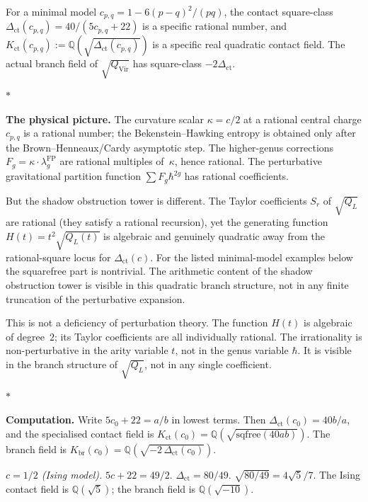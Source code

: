 \documentclass[11pt]{article}
\newcommand{\Q}{\mathbb{Q}}
\newcommand{\sep}{\bigskip\begin{center}$*$\end{center}\medskip}
\begin{document}
For a minimal model $c_{p,q} = 1 - 6(p-q)^2/(pq)$,
the contact square-class
$\Delta_{\mathrm{ct}}(c_{p,q}) = 40/(5c_{p,q} + 22)$ is a
specific rational number, and
$K_{\mathrm{ct}}(c_{p,q}) := \Q(\sqrt{\Delta_{\mathrm{ct}}(c_{p,q})})$
is a specific real quadratic contact field.  The actual branch
field of $\sqrt{Q_{\mathrm{Vir}}}$ has square-class
$-2\Delta_{\mathrm{ct}}$.

\sep

\noindent\textbf{The physical picture.}\enspace
The curvature scalar $\kappa = c/2$ at a rational
central charge $c_{p,q}$ is a rational number; the
Bekenstein--Hawking entropy is obtained only after the
Brown--Henneaux/Cardy asymptotic step.  The
higher-genus corrections $F_g = \kappa \cdot \lambda_g^{\mathrm{FP}}$
are rational multiples of~$\kappa$, hence rational.  The
perturbative gravitational partition function
$\sum F_g \hbar^{2g}$ has rational coefficients.

But the shadow obstruction tower is different.  The Taylor coefficients
$S_r$ of $\sqrt{Q_L}$ are rational (they satisfy a rational
recursion), yet the generating function $H(t) = t^2\sqrt{Q_L(t)}$
is algebraic and genuinely quadratic away from the rational-square
locus for $\Delta_{\mathrm{ct}}(c)$.  For the listed minimal-model examples below
the squarefree part is nontrivial.  The arithmetic content of the
shadow obstruction tower is visible in this quadratic branch
structure, not in any finite truncation of the perturbative
expansion.

This is not a deficiency of perturbation theory.  The function
$H(t)$ is algebraic of degree~$2$; its Taylor coefficients are
all individually rational.  The irrationality is non-perturbative
in the arity variable $t$, not in the genus variable $\hbar$.
It is visible in the branch structure of $\sqrt{Q_L}$, not in
any single coefficient.

\sep

\noindent\textbf{Computation.}\enspace
Write $5c_0 + 22 = a/b$ in lowest terms.  Then
$\Delta_{\mathrm{ct}}(c_0) = 40b/a$, and the specialised contact
field is $K_{\mathrm{ct}}(c_0) =
\Q(\sqrt{\mathrm{sqfree}(40ab)})$.  The branch field is
$K_{\mathrm{br}}(c_0)=\Q(\sqrt{-2\,\Delta_{\mathrm{ct}}(c_0)})$.

\medskip

\noindent\textit{$c = 1/2$ (Ising model).}\enspace
$5c + 22 = 49/2$.  $\Delta_{\mathrm{ct}} = 80/49$.
$\sqrt{80/49} = 4\sqrt{5}/7$.
The Ising contact field is $\Q(\sqrt{5})$; the branch field is
$\Q(\sqrt{-10})$.
\end{document}
